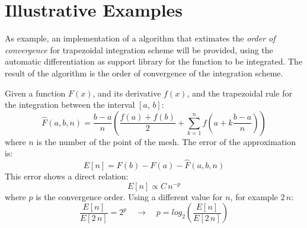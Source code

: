 \section{Illustrative Examples}
\label{sec:examples}


As example, an implementation of a algorithm that extimates the \emph{order of convergence} for trapezoidal integration scheme will be provided, using the automatic differentiation as support library for the function to be integrated. The result of the algorithm is the order of convergence of the integration scheme.

Given a function $F(x)$, and its derivative $f(x)$, and the trapezoidal rule for the integration between the interval $[a,\,b]$:
\begin{equation}
  \hat{F}(a, b, n) = \dfrac{b - a}{n} \left( \dfrac{f(a) + f(b)}{2} +
    \sum\limits_{k = 1}^{n}{f \left( a + k \dfrac{b - a}{n} \right)} \right)
\end{equation}
where $n$ is the number of the point of the mesh. The error of the approximation is:
\begin{equation}
  E[n] = F(b) - F(a) - \hat{F}(a, b, n)
\end{equation}
This error shows a direct relation:
\begin{equation}
  E[n] \propto C\,{n}^{-p}
\end{equation}
where $p$ is the convergence order. Using a different value for $n$, for example $2\,n$:
\begin{equation}
  \dfrac{E[n]}{E[2\,n]} = 2^{p} \quad \rightarrow \quad p = log_2 \left( \dfrac{E[n]}{E[2\,n]} \right)
\end{equation}



